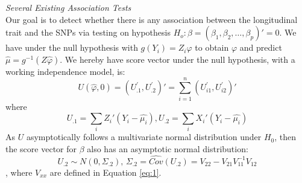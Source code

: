 \documentclass[12pt]{article}
\begin{document}
\textit{Several Existing Association Tests}\\
Our goal is to detect whether there is any association between the longitudinal trait and the SNPs via testing on hypothesis $H_{o}:\beta=(\beta_{1},\beta_{2},\ldots,\beta_{p})'=0$. We have under the null hypothesis with $g(Y_i)=Z_i\varphi$ to obtain $\varphi$ and predict $\hat{\mu}=g^{-1}(Z\hat{\varphi})$. We hereby have score vector under the null hypothesis, with a working independence model, is:
$$U(\hat{\varphi},0)=(U_{.1}^{'}, U_{.2}^{'})'=\sum_{i=1}^{n}(U_{i1}^{'},U_{i2}^{'})'$$
where
$$U_{.1}=\sum_{i}Z_{i}'(Y_{i}-\hat{\mu_{i}}), U_{.2}=\sum_{i}X_{i}'(Y_{i}-\hat{\mu_{i}})$$ 
As $U$ asymptotically follows a multivariate normal distribution under $H_{0}$, then the score vector for $\beta$ also has an asymptotic normal distribution:\\
$$
U_{.2}\sim N(0,\Sigma_{.2}),\,\Sigma_{.2}= \widehat{Cov} (U_{.2}) = V_{22} - V_{21} V_{11}^{-1} V_{12}
$$, where $V_{xx}$ are defined in Equation \ref{eq:1}.
\end{document}
